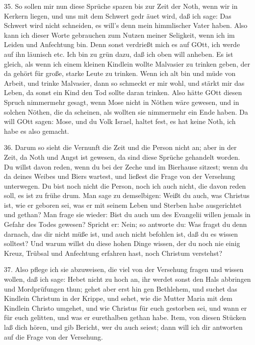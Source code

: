 35. So sollen mir nun diese Sprüche sparen bis zur Zeit der Noth, wenn wir in Kerkern liegen, und uns mit dem Schwert gedr äuet wird, daß ich sage: Das Schwert wird nicht schneiden, es will’s denn mein himmlischer Vater haben. Also kann ich dieser Worte gebrauchen zum Nutzen meiner Seligkeit, wenn ich im Leiden und Anfechtung bin. Denn sonst verdrießt mich es auf GOtt, ich werde auf ihn läunisch etc. Ich bin zu grün dazu, daß ich oben will anheben. Es ist gleich, als wenn ich einem kleinen Kindlein wollte Malvasier zu trinken geben, der da gehört für große, starke Leute zu trinken. Wenn ich alt bin und müde von Arbeit, und trinke Malvasier, dann so schmeckt er mir wohl, und stärkt mir das Leben, da sonst ein Kind den Tod sollte daran trinken. Also hätte GOtt diesen Spruch nimmermehr gesagt, wenn Mose nicht in Nöthen wäre gewesen, und in solchen Nöthen, die da scheinen, als wollten sie nimmermehr ein Ende haben. Da will GOtt sagen: Mose, und du Volk Israel, haltet fest, es hat keine Noth, ich habe es also gemacht.

36. Darum so sieht die Vernunft die Zeit und die Person nicht an; aber in der Zeit, da Noth und Angst ist gewesen, da sind diese Sprüche gehandelt worden. Du willst davon reden, wenn du bei der Zeche und im Bierhause sitzest; wenn du da deines Weibes und Biers wartest, und ließest die Frage von der Versehung unterwegen. Du bist noch nicht die Person, noch ich auch nicht, die davon reden soll, es ist zu frühe drum. Man sage zu demselbigen: Weißt du auch, was Christus ist, wie er geboren sei, was er mit seinem Leben und Sterben habe ausgerichtet und gethan? Man frage sie wieder: Bist du auch um des Evangelii willen jemals in Gefahr des Todes gewesen? Spricht er: Nein; so antworte du: Was fragst du denn darnach, das dir nicht müße ist, und auch nicht befohlen ist, daß du es wissen solltest? Und warum willst du diese hohen Dinge wissen, der du noch nie einig Kreuz, Trübsal und Anfechtung erfahren hast, noch Christum verstehst?

37. Also pflege ich sie abzuweisen, die viel von der Versehung fragen und wissen wollen, daß ich sage: Hebet nicht zu hoch an, ihr werdet sonst den Hals abbringen und Mordprüfungen thun; gehet aber erst hin gen Bethlehem, und suchet das Kindlein Christum in der Krippe, und sehet, wie die Mutter Maria mit dem Kindlein Christo umgehet, und wie Christus für euch gestorben sei, und wann er für euch gelitten, und was er eurethalben gethan habe. Item, von diesen Stücken laß dich hören, und gib Bericht, wer du auch seiest; dann will ich dir antworten auf die Frage von der Versehung.

